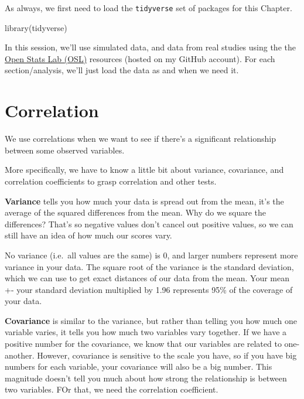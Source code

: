 \documentclass[
]{book}
\newenvironment{Shaded}{\begin{snugshade}}{\end{snugshade}}
\newcommand{\FunctionTok}[1]{\textcolor[rgb]{0.00,0.00,0.00}{#1}}
\newcommand{\NormalTok}[1]{#1}
\begin{document}
As always, we first need to load the \texttt{tidyverse} set of packages for this Chapter.

\begin{Shaded}
\begin{Highlighting}[]
\FunctionTok{library}\NormalTok{(tidyverse)}
\end{Highlighting}
\end{Shaded}

In this session, we'll use simulated data, and data from real studies using the the \href{https://sites.trinity.edu/osl}{Open Stats Lab (OSL)} resources (hosted on my GitHub account). For each section/analysis, we'll just load the data as and when we need it.

\hypertarget{correlation}{%
\section{Correlation}\label{correlation}}

We use correlations when we want to see if there's a significant relationship between some observed variables.

More specifically, we have to know a little bit about variance, covariance, and correlation coefficients to grasp correlation and other tests.

\textbf{Variance} tells you how much your data is spread out from the mean, it's the average of the squared differences from the mean. Why do we square the differences? That's so negative values don't cancel out positive values, so we can still have an idea of how much our scores vary.

No variance (i.e.~all values are the same) is 0, and larger numbers represent more variance in your data. The square root of the variance is the standard deviation, which we can use to get exact distances of our data from the mean. Your mean +- your standard deviation multiplied by 1.96 represents 95\% of the coverage of your data.

\textbf{Covariance} is similar to the variance, but rather than telling you how much one variable varies, it tells you how much two variables vary together. If we have a positive number for the covariance, we know that our variables are related to one-another. However, covariance is sensitive to the scale you have, so if you have big numbers for each variable, your covariance will also be a big number. This magnitude doesn't tell you much about how strong the relationship is between two variables. FOr that, we need the correlation coefficient.
\end{document}
